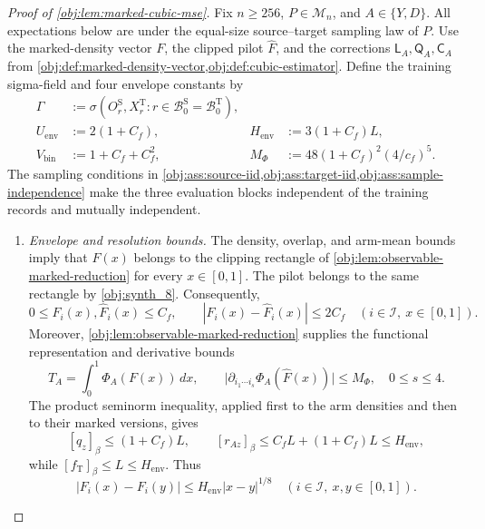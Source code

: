 \begin{proof}[Proof of \cref{obj:lem:marked-cubic-mse}]
Fix \(n\ge256\), \(P\in\mathcal M_n\), and \(A\in\{Y,D\}\). All expectations below are under the equal-size source--target sampling law of \(P\). Use the marked-density vector \(F\), the clipped pilot \(\widehat F\), and the corrections \(\mathsf L_A,\mathsf Q_A,\mathsf C_A\) from \cref{obj:def:marked-density-vector,obj:def:cubic-estimator}. Define the training sigma-field and four envelope constants by
\[
\begin{aligned}
\Gamma
&:=\sigma\!\left(
O_r^{\mathrm S},X_r^{\mathrm T}:
r\in\mathcal B_0^{\mathrm S}
=\mathcal B_0^{\mathrm T}
\right),\\
U_{\mathrm{env}}&:=2(1+C_f),&
H_{\mathrm{env}}&:=3(1+C_f)L,\\
V_{\mathrm{bin}}&:=1+C_f+C_f^2,&
M_{\Phi}&:=48(1+C_f)^2(4/c_f)^5.
\end{aligned}
\]
The sampling conditions in
\cref{obj:ass:source-iid,obj:ass:target-iid,obj:ass:sample-independence}
make the three evaluation blocks independent of the training records and mutually independent.

\begin{enumerate}
\item \textit{Envelope and resolution bounds.}
The density, overlap, and arm-mean bounds imply that \(F(x)\) belongs to the clipping rectangle of \cref{obj:lem:observable-marked-reduction} for every \(x\in[0,1]\). The pilot belongs to the same rectangle by \cref{obj:synth_8}. Consequently,
\[
0\le F_i(x),\widehat F_i(x)\le C_f,
\qquad
|F_i(x)-\widehat F_i(x)|\le2C_f
\quad(i\in\mathcal I,\ x\in[0,1]).
\]
Moreover, \cref{obj:lem:observable-marked-reduction} supplies the functional representation and derivative bounds
\[
T_A=\int_0^1\Phi_A(F(x))\,dx,
\qquad
\bigl|\partial_{i_1\cdots i_s}\Phi_A(\widehat F(x))\bigr|
\le M_{\Phi},
\quad 0\le s\le4.
\]
The product seminorm inequality, applied first to the arm densities and then to their marked versions, gives
\[
[q_z]_\beta\le(1+C_f)L,\qquad
[r_{Az}]_\beta
\le C_fL+(1+C_f)L
\le H_{\mathrm{env}},
\]
while \([f_{\mathrm T}]_\beta\le L\le H_{\mathrm{env}}\). Thus
\[
|F_i(x)-F_i(y)|
\le H_{\mathrm{env}}|x-y|^{1/8}
\quad(i\in\mathcal I,\ x,y\in[0,1]).
\]


\end{enumerate}
\end{proof}
